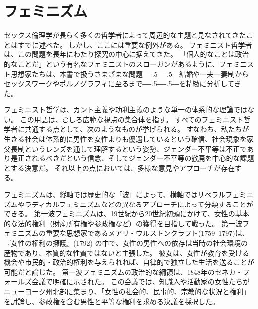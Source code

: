 \documentclass[paper=a4,book,openany]{jlreq}
\def\DDASH{―\kern-.5\zw―\kern-.5\zw―} %
\begin{document}
\section{フェミニズム}

セックス倫理学が長らく多くの哲学者によって周辺的な主題と見なされてきたことはすでに述べた。
しかし、ここには重要な例外がある。
フェミニスト哲学者は、この問題を長年にわたり探究の中心に据えてきた。
「個人的なことは政治的なことだ」という有名なフェミニストのスローガンがあるように、フェミニスト思想家たちは、本書で扱うさまざまな問題{\DDASH}結婚や一夫一妻制からセックスワークやポルノグラフィに至るまで{\DDASH}を精緻に分析してきた。

フェミニスト哲学は、カント主義や功利主義のような単一の体系的な理論ではない。
この用語は、むしろ広範な視点の集合体を指す。
すべてのフェミニスト哲学者に共通する点として、次のようなものが挙げられる。
すなわち、私たちが生きる社会は体系的に男性を女性よりも優遇しているという確信、社会現象を家父長制というレンズを通して理解するという姿勢、ジェンダー不平等は不正であり是正されるべきだという信念、そしてジェンダー不平等の撤廃を中心的な課題とする決意だ。
それ以上の点においては、多様な意見やアプローチが存在する。

フェミニズムは、縦軸では歴史的な「波」によって、横軸ではリベラルフェミニズムやラディカルフェミニズムなどの異なるアプローチによって分類することができる。
第一波フェミニズムは、19世紀から20世紀初頭にかけて、女性の基本的な法的権利（財産所有権や参政権など）の獲得を目指して戦った。
第一波フェミニズムの重要な思想家であるメアリ・ウルストンクラフト(1759--1797)は、『女性の権利の擁護』(1792)\nocite{ウルストンクラーフト女性の権利}
の中で、女性の男性への依存は当時の社会環境の産物であり、本質的な性質ではないと主張した。
彼女は、女性が教育を受ける機会や市民的・政治的権利を与えられれば、自律的で独立した生活を送ることが可能だと論じた\citep{wollstonecraft93:_vindic_right_woman}。
第一波フェミニズムの政治的な綱領は、1848年のセネカ・フォールズ会議で明確に示された。
この会議では、知識人や活動家の女性たちがニューヨーク州北部に集まり、「女性の社会的、民事的、宗教的な状況と権利」を討論し、参政権を含む男性と平等な権利を求める決議を採択した\citep{parker08:_senec_falls_conven}。
\end{document}
